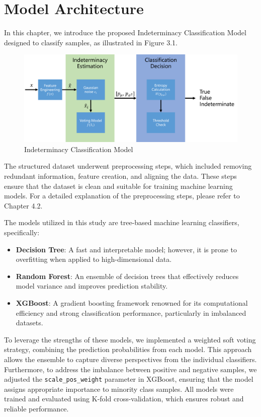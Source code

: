 \section{Model Architecture}
In this chapter, we introduce the proposed Indeterminacy Classification Model designed to classify samples, as illustrated in Figure 3.1.

\begin{figure}[H]
    \centering
    \includegraphics[width=1\linewidth]{figures/model_architecture.png}
    \caption{Indeterminacy Classification Model}
    \label{fig:enter-label}
\end{figure}

The structured dataset underwent preprocessing steps, which included removing redundant information, feature creation, and aligning the data. These steps ensure that the dataset is clean and suitable for training machine learning models. For a detailed explanation of the preprocessing steps, please refer to Chapter 4.2.

The models utilized in this study are tree-based machine learning classifiers, specifically:

\begin{itemize}
    \item \textbf{Decision Tree}: A fast and interpretable model; however, it is prone to overfitting when applied to high-dimensional data.
    \item \textbf{Random Forest}: An ensemble of decision trees that effectively reduces model variance and improves prediction stability.
    \item \textbf{XGBoost}: A gradient boosting framework renowned for its computational efficiency and strong classification performance, particularly in imbalanced datasets.
\end{itemize}

To leverage the strengths of these models, we implemented a weighted soft voting strategy, combining the prediction probabilities from each model. This approach allows the ensemble to capture diverse perspectives from the individual classifiers. Furthermore, to address the imbalance between positive and negative samples, we adjusted the \texttt{scale\_pos\_weight} parameter in XGBoost, ensuring that the model assigns appropriate importance to minority class samples. All models were trained and evaluated using K-fold cross-validation, which ensures robust and reliable performance.

